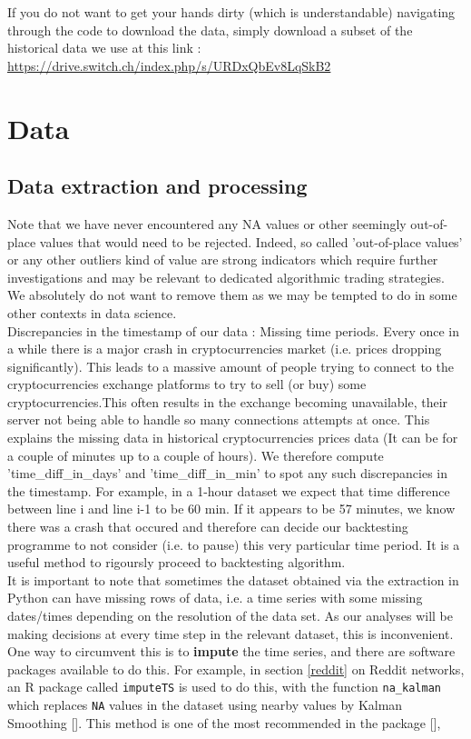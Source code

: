\documentclass[twoside]{report}
\newcommand{\code}{\texttt}
\begin{document}
\begin{spacing}{1}
If you do not want to get your hands dirty (which is understandable) navigating through the code to download the data, simply download a subset of the historical data we use at this link : \url{https://drive.switch.ch/index.php/s/URDxQbEv8LqSkB2}




\section{Data}
\subsection{Data extraction and processing}


Note that we have never encountered any NA values or other seemingly out-of-place values that would need to be rejected. Indeed, so called 'out-of-place values' or any other outliers kind of value are strong indicators which require further investigations and may be relevant to dedicated algorithmic trading strategies. We absolutely do not want to remove them as we may be tempted to do in some other contexts in data science.\\

Discrepancies in the timestamp of our data : Missing time periods. Every once in a while there is a major crash in cryptocurrencies market (i.e. prices dropping significantly). This leads to a massive amount of people trying to connect to the cryptocurrencies exchange platforms to try to sell (or buy) some cryptocurrencies.This often results in the exchange becoming unavailable, their server not being able to handle so many connections attempts at once. This explains the missing data in historical cryptocurrencies prices data (It can be for a couple of minutes up to a couple of hours). We therefore compute 'time\_diff\_in\_days' and 'time\_diff\_in\_min' to spot any such discrepancies in the timestamp. For example, in a 1-hour dataset we expect that time difference between line i and line i-1 to be 60 min. If it appears to be 57 minutes, we know there was a crash that occured and therefore can decide our backtesting programme to not consider (i.e. to pause) this very particular time period. It is a useful method to rigoursly proceed to backtesting algorithm. \\



It is important to note that sometimes the dataset obtained via the extraction in Python can have missing rows of data, i.e. a time series with some missing dates/times depending on the resolution of the data set. As our analyses will be making decisions at every time step in the relevant dataset, this is inconvenient. One way to circumvent this is to \textbf{impute} the time series, and there are software packages available to do this. For example, in section \ref{reddit} on Reddit networks, an R package called \code{imputeTS} is used to do this, with the function \code{na\_kalman} which replaces \code{NA} values in the dataset using nearby values by Kalman Smoothing []. This method is one of the most recommended in the package [],


\end{spacing}
\end{document}
